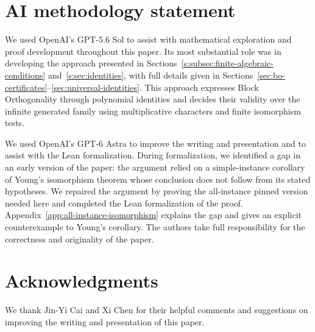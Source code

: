 \documentclass[11pt,letterpaper,onecolumn]{article}
\theoremstyle{plain}
\theoremstyle{definition}
\theoremstyle{remark}
\begin{document}
\section*{AI methodology statement}

We used OpenAI's GPT-5.6 Sol to assist with mathematical exploration and
proof development throughout this paper. Its most substantial role was
in developing the approach presented in
Sections~\ref{s:subsec:finite-algebraic-conditions} and~\ref{s:sec:identities},
with full details given in
Sections~\ref{sec:bo-certificates}--\ref{sec:universal-identities}.
This approach expresses Block Orthogonality through
polynomial identities and decides their validity over the infinite
generated family using multiplicative characters and finite isomorphism
tests.

We used OpenAI's GPT-6 Astra to improve the writing and presentation and
to assist with the Lean formalization. During formalization, we identified
a gap in an early version of the paper: the argument relied on a
simple-instance corollary of Young's isomorphism theorem whose conclusion
does not follow from its stated hypotheses. We repaired the argument by
proving the all-instance pinned version needed here and completed the
Lean formalization of the proof.
Appendix~\ref{app:all-instance-isomorphism} explains the gap and gives an
explicit counterexample to Young's corollary. The authors take full
responsibility for the correctness and originality of the paper.

\section*{Acknowledgments}

We thank Jin-Yi Cai and Xi Chen for their helpful comments and suggestions
on improving the writing and presentation of this paper.

\label{s:end:main}

\end{document}
